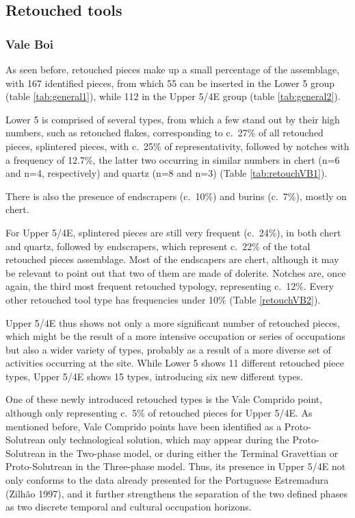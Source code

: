 \documentclass[12pt,twoside]{reedthesis}
\begin{document}
\hypertarget{retouched-tools}{%
\subsection{Retouched tools}\label{retouched-tools}}

\hypertarget{vale-boi-7}{%
\subsubsection{Vale Boi}\label{vale-boi-7}}

As seen before, retouched pieces make up a small percentage of the assemblage, with 167 identified pieces, from which 55 can be inserted in the Lower 5 group (table \ref{tab:general1}), while 112 in the Upper 5/4E group (table \ref{tab:general2}).

Lower 5 is comprised of several types, from which a few stand out by their high numbers, such as retouched flakes, corresponding to c.~27\% of all retouched pieces, splintered pieces, with c.~25\% of representativity, followed by notches with a frequency of 12.7\%, the latter two occurring in similar numbers in chert (n=6 and n=4, respectively) and quartz (n=8 and n=3) (Table \ref{tab:retouchVB1}).

There is also the presence of endscrapers (c.~10\%) and burins (c.~7\%), mostly on chert.

For Upper 5/4E, splintered pieces are still very frequent (c.~24\%), in both chert and quartz, followed by endscrapers, which represent c.~22\% of the total retouched pieces assemblage. Most of the endscapers are chert, although it may be relevant to point out that two of them are made of dolerite. Notches are, once again, the third most frequent retouched typology, representing c.~12\%. Every other retouched tool type has frequencies under 10\% (Table \ref{retouchVB2}).

Upper 5/4E thus shows not only a more significant number of retouched pieces, which might be the result of a more intensive occupation or series of occupations but also a wider variety of types, probably as a result of a more diverse set of activities occurring at the site. While Lower 5 shows 11 different retouched piece types, Upper 5/4E shows 15 types, introducing six new different types.

One of these newly introduced retouched types is the Vale Comprido point, although only representing c.~5\% of retouched pieces for Upper 5/4E. As mentioned before, Vale Comprido points have been identified as a Proto-Solutrean only technological solution, which may appear during the Proto-Solutrean in the Two-phase model, or during either the Terminal Gravettian or Proto-Solutrean in the Three-phase model. Thus, its presence in Upper 5/4E not only conforms to the data already presented for the Portuguese Estremadura (Zilhão 1997), and it further strengthens the separation of the two defined phases as two discrete temporal and cultural occupation horizons.
\end{document}
